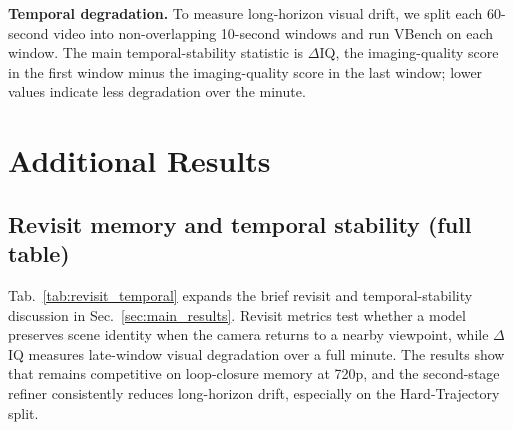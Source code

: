 \noindent\textbf{Temporal degradation.}
To measure long-horizon visual drift, we split each 60-second video into non-overlapping 10-second windows and run VBench on each window.
The main temporal-stability statistic is $\Delta$IQ, the imaging-quality score in the first window minus the imaging-quality score in the last window; lower values indicate less degradation over the minute.

\section{Additional Results}
\label{sec:appendix_results}

\subsection{Revisit memory and temporal stability (full table)}
\label{sec:appendix_revisit_temporal}

Tab.~\ref{tab:revisit_temporal} expands the brief revisit and temporal-stability discussion in Sec.~\ref{sec:main_results}.
Revisit metrics test whether a model preserves scene identity when the camera returns to a nearby viewpoint, while $\Delta$IQ measures late-window visual degradation over a full minute.
The results show that \modelname remains competitive on loop-closure memory at 720p, and the second-stage refiner consistently reduces long-horizon drift, especially on the Hard-Trajectory split.

